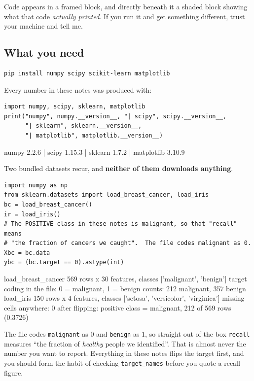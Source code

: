 \documentclass[11pt]{article}
\begin{document}
Code appears in a framed block, and directly beneath it a shaded block showing
what that code \emph{actually printed}. If you run it and get something
different, trust your machine and tell me.

\subsection{What you need}

\begin{lstlisting}
pip install numpy scipy scikit-learn matplotlib
\end{lstlisting}

Every number in these notes was produced with:

\begin{lstlisting}
import numpy, scipy, sklearn, matplotlib
print("numpy", numpy.__version__, "| scipy", scipy.__version__,
      "| sklearn", sklearn.__version__,
      "| matplotlib", matplotlib.__version__)
\end{lstlisting}
\begin{codeout}
numpy 2.2.6 | scipy 1.15.3 | sklearn 1.7.2 | matplotlib 3.10.9
\end{codeout}

Two bundled datasets recur, and \textbf{neither of them downloads anything}.

\begin{lstlisting}
import numpy as np
from sklearn.datasets import load_breast_cancer, load_iris
bc = load_breast_cancer()
ir = load_iris()
# The POSITIVE class in these notes is malignant, so that "recall" means
# "the fraction of cancers we caught".  The file codes malignant as 0.
Xbc = bc.data
ybc = (bc.target == 0).astype(int)
\end{lstlisting}
\begin{codeout}
load_breast_cancer 569 rows x 30 features, classes ['malignant', 'benign']
   target coding in the file: 0 = malignant, 1 = benign
   counts: 212 malignant, 357 benign
load_iris          150 rows x 4 features, classes ['setosa', 'versicolor', 'virginica']
missing cells anywhere: 0
after flipping: positive class = malignant, 212 of 569 rows (0.3726)
\end{codeout}

\begin{caution}
The file codes \texttt{malignant} as $0$ and \texttt{benign} as $1$, so
straight out of the box \texttt{recall} measures ``the fraction of
\emph{healthy} people we identified''. That is almost never the number you
want to report. Everything in these notes flips the target first, and you
should form the habit of checking \texttt{target\_names} before you quote a
recall figure.
\end{caution}
\end{document}
